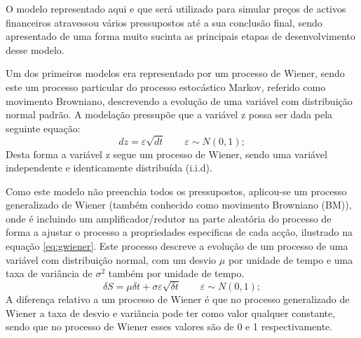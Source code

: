 \documentclass[
  12pt,
  a4paper,
  openany]{book}
\begin{document}
O modelo representado aqui e que será utilizado para simular preços de activos financeiros atravessou vários pressupostos até a sua conclusão final, sendo apresentado de uma forma muito sucinta as principais etapas de desenvolvimento desse modelo.

Um dos primeiros modelos era representado por um processo de Wiener, sendo este um processo particular do processo estocástico Markov, referido como movimento Browniano, descrevendo a evolução de uma variável com distribuição normal padrão. A modelação pressupõe que a variável z possa ser dada pela seguinte equação:
\begin{equation} 
  dz = \varepsilon \sqrt{dt}\qquad   \varepsilon \sim N(0,1);
  \label{eq:wiener}
\end{equation}
Desta forma a variável z segue um processo de Wiener, sendo uma variável independente e identicamente distribuída (i.i.d).

Como este modelo não preenchia todos os pressupostos, aplicou-se um processo generalizado de Wiener (também conhecido como movimento Browniano (BM)), onde é incluindo um amplificador/redutor na parte aleatória do processo de forma a ajustar o processo a propriedades especificas de cada acção, ilustrado na equação \eqref{eq:gwiener}. Este processo descreve a evolução de um processo de uma variável com distribuição normal, com um desvio \(\mu\) por unidade de tempo e uma taxa de variância de \(\sigma^2\) também por unidade de tempo.
\begin{equation} 
  \delta S = \mu\delta t +\sigma\varepsilon\sqrt{\delta t}\qquad\varepsilon \sim N(0,1);
  \label{eq:gwiener}
\end{equation}
A diferença relativo a um processo de Wiener é que no processo generalizado de Wiener a taxa de desvio e variância pode ter como valor qualquer constante, sendo que no processo de Wiener esses valores são de 0 e 1 respectivamente.
\end{document}

